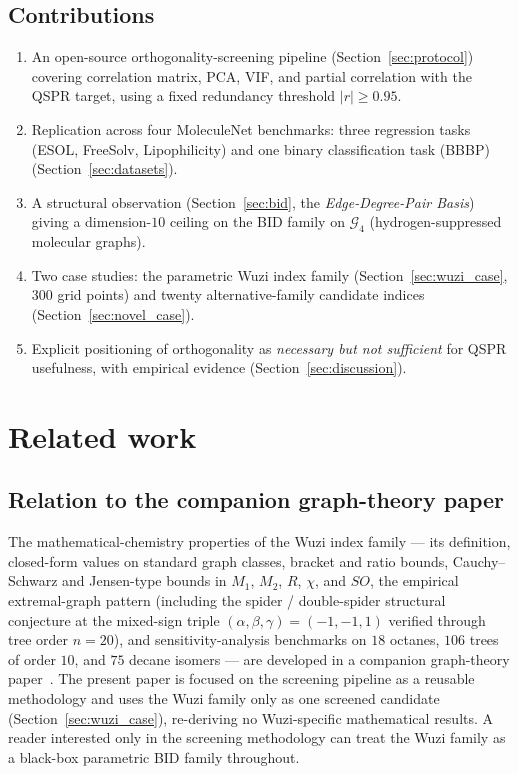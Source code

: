 \documentclass[STIX1COL]{WileyNJDv5}
\theoremstyle{definition}
\begin{document}
\subsection{Contributions}

\begin{enumerate}[label=(\arabic*)]
\item An open-source orthogonality-screening pipeline
(Section~\ref{sec:protocol}) covering correlation matrix,
PCA, VIF, and partial correlation with the QSPR target, using
a fixed redundancy threshold $|r|\ge 0.95$.
\item Replication across four MoleculeNet benchmarks: three
regression tasks (ESOL, FreeSolv, Lipophilicity) and one binary
classification task (BBBP)
(Section~\ref{sec:datasets}).
\item A structural observation (Section~\ref{sec:bid}, the
\emph{Edge-Degree-Pair Basis}) giving a dimension-$10$ ceiling on
the BID family on $\mathcal{G}_4$ (hydrogen-suppressed molecular
graphs).
\item Two case studies: the parametric Wuzi index family
(Section~\ref{sec:wuzi_case}, $300$ grid points) and twenty
alternative-family candidate indices
(Section~\ref{sec:novel_case}).
\item Explicit positioning of orthogonality as \emph{necessary but
not sufficient} for QSPR usefulness, with empirical evidence
(Section~\ref{sec:discussion}).
\end{enumerate}

\section{Related work}\label{sec:related}

\subsection{Relation to the companion graph-theory paper}\label{sec:relation_companion}

The mathematical-chemistry properties of the Wuzi index family ---
its definition, closed-form values on standard graph classes,
bracket and ratio bounds, Cauchy--Schwarz and Jensen-type bounds
in $M_1$, $M_2$, $R$, $\chi$, and $SO$, the empirical
extremal-graph pattern (including the spider / double-spider
structural conjecture at the mixed-sign triple
$(\alpha, \beta, \gamma) = (-1, -1, 1)$ verified through tree
order $n = 20$), and sensitivity-analysis benchmarks on $18$
octanes, $106$ trees of order $10$, and $75$ decane isomers ---
are developed in a companion graph-theory
paper~\cite{Paper1_Wuzi}. The present paper is focused on the
screening pipeline as a reusable methodology and uses the Wuzi
family only as one screened candidate (Section~\ref{sec:wuzi_case}),
re-deriving no Wuzi-specific mathematical results. A reader
interested only in the screening methodology can treat the Wuzi
family as a black-box parametric BID family throughout.
\end{document}
